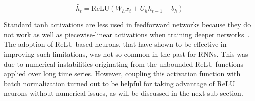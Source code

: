 \documentclass[journal]{IEEEtran}
\begin{document}
\begin{equation}
\widetilde{h_{t}}=\mbox{ReLU}(W_{h}x_{t}+U_{h}h_{t-1}+b_{h})
\end{equation}

Standard tanh activations are less used in feedforward networks because they do not work as well as piecewise-linear activations when training deeper networks~\cite{xavier}. The adoption of ReLU-based neurons, that have shown to be effective in improving such limitations, was not so common in the past for RNNs. This was due to numerical instabilities originating from the unbounded ReLU functions applied over long time series. However, coupling this activation function with batch normalization turned out to be helpful for taking advantage of ReLU neurons without numerical issues, as will be discussed in the next sub-section.



\end{document}
